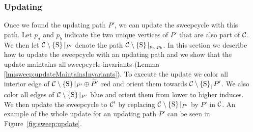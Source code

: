 \subsubsection{Updating}
  \label{sss:sweep:update}
  Once we found the updating path $P'$, we can update the sweepcycle with this path.  Let $p_a$ and $p_b$ indicate the two unique vertices of $P'$ that are also part of $\mathcal{C}$. We then let $\mathcal{C} \setminus \left\lbrace {\mathrm{S}} \right\rbrace|_{P'}$ denote the path $\mathcal{C} \setminus \left\lbrace {\mathrm{S}} \right\rbrace|_{p_a, p_b}$.
  In this section we describe how to update the sweepcycle with an updating path and we show that the update maintains all sweepcycle invariants (Lemma \ref{lm:sweep:updateMaintainsInvariants}).
  To execute the update we color all interior edge of $\mathcal{C} \setminus \left\lbrace {\mathrm{S}} \right\rbrace|_{P'} \oplus \accentset{\leftharpoonup}{P'}$ red and orient them towards $\mathcal{C} \setminus \left\lbrace {\mathrm{S}} \right\rbrace_|{P'}$.
  We also color all edges of $\mathcal{C} \setminus \left\lbrace {\mathrm{S}} \right\rbrace|_{P'}$  blue and orient them from lower to higher induces.
  We then update the sweepcycle to $\mathcal{C}'$ by replacing $\mathcal{C} \setminus \left\lbrace {\mathrm{S}} \right\rbrace|_{P'}$ by $P'$ in $\mathcal{C}$.
  An example of the whole update for an updating path $P'$ can be seen in Figure~\ref{fig:sweep:update}.

